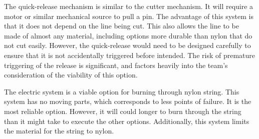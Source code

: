 		The quick-release mechanism is similar to the cutter mechanism. It will require a motor or similar mechanical source to pull a pin. The advantage of this system is that it does not depend on the line being cut. This also allows the line to be made of almost any material, including options more durable than nylon that do not cut easily. However, the quick-release would need to be designed carefully to ensure that it is not accidentally triggered before intended. The risk of premature triggering of the release is significant, and factors heavily into the team’s consideration of the viability of this option. 
	
		The electric system is a viable option for burning through nylon string. This system has no moving parts, which corresponds to less points of failure. It is the most reliable option. However, it will could longer to burn through the string than it might take to execute the other options. Additionally, this system limits the material for the string to nylon. 
